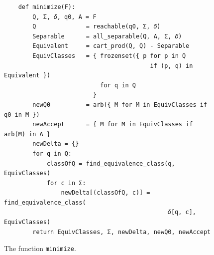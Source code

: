 \begin{figure}[!ht]
\centering
\begin{verbatim}
    def minimize(F):
        Q, Σ, 𝛿, q0, A = F
        Q              = reachable(q0, Σ, 𝛿)
        Separable      = all_separable(Q, A, Σ, 𝛿)
        Equivalent     = cart_prod(Q, Q) - Separable
        EquivClasses   = { frozenset({ p for p in Q
                                         if (p, q) in Equivalent })
                           for q in Q
                         }
        newQ0          = arb({ M for M in EquivClasses if q0 in M })
        newAccept      = { M for M in EquivClasses if arb(M) in A }
        newDelta = {}
        for q in Q:
            classOfQ = find_equivalence_class(q, EquivClasses)
            for c in Σ:
                newDelta[(classOfQ, c)] = find_equivalence_class(
                                              𝛿[q, c], EquivClasses)
        return EquivClasses, Σ, newDelta, newQ0, newAccept
\end{verbatim}
\vspace*{-0.3cm}
\caption{The function \texttt{minimize}.}
\label{fig:08-Minimize.ipynb:minimize}
\end{figure}

